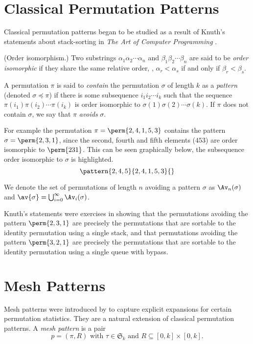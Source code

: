 \section{Classical Permutation Patterns}
Classical permutation patterns began to be studied as a result of Knuth's
statements about stack-sorting in \emph{The Art of Computer Programming}
\cite[p.~243, Ex.~5,6]{Knuth:1997:ACP:260999}.

\begin{definition}{(Order isomorphism.)}
    Two substrings \(\alpha_1\alpha_2\dotsm\alpha_n\) and
    \(\beta_1\beta_2\dotsm\beta_n\) are said to be \emph{order isomorphic}
    if they share the same relative order, \ie, \(\alpha_r<\alpha_s\) if and
    only if \(\beta_r<\beta_s\).
\end{definition}

A permutation \(\pi\) is said to \emph{contain} the permutation \(\sigma\) of
length \(k\) as a \emph{pattern} (denoted \(\sigma \preceq \pi\)) if there is some
subsequence \(i_1i_2\dotsm{}i_k\) such that the sequence
\(\pi(i_1)\pi(i_2)\dotsm\pi(i_k)\) is order isomorphic to
\(\sigma(1)\sigma(2)\dotsm\sigma(k)\). If \(\pi\) does not contain
\(\sigma\), we say that \(\pi\) \emph{avoids} \(\sigma\).

For example the permutation \(\pi = \perm{2,4,1,5,3}\) contains the pattern
\(\sigma = \perm{2,3,1}\), since the second, fourth and fifth elements
(\(453\)) are order isomorphic to \(\perm{231}\).
This can be seen graphically below, the subsequence order isomorphic to \(\sigma\)
is highlighted.
\begin{equation*}
    \pattern{2,4,5}{2,4,1,5,3}{}
\end{equation*}

We denote the set of permutations of length \(n\) avoiding a pattern \(\sigma\)
as \(\Av_n(\sigma)\) and \(\av{\sigma} = \bigcup_{i=0}^{\infty}\Av_i(\sigma)\).

Knuth's statements were exercises in showing that the permutations avoiding the
pattern \(\perm{2,3,1}\) are precisely the permutations that are sortable to
the identity permutation using a single stack, and that permutations avoiding the
pattern \(\perm{3,2,1}\) are precisely the permutations that are sortable to
the identity permutation using a single queue with bypass.

\section{Mesh Patterns}
Mesh patterns were introduced by \textcite{journals/combinatorics/BrandenC11} to
capture explicit expansions for certain permutation statistics. They are a
natural extension of classical permutation patterns.
A \emph{mesh pattern} is a pair
\begin{equation*}
    p = (\pi,R)\text{ with } \tau \in \mathfrak{S}_k \text{ and } R \subseteq
    [0,k]\times [0,k].
\end{equation*}

